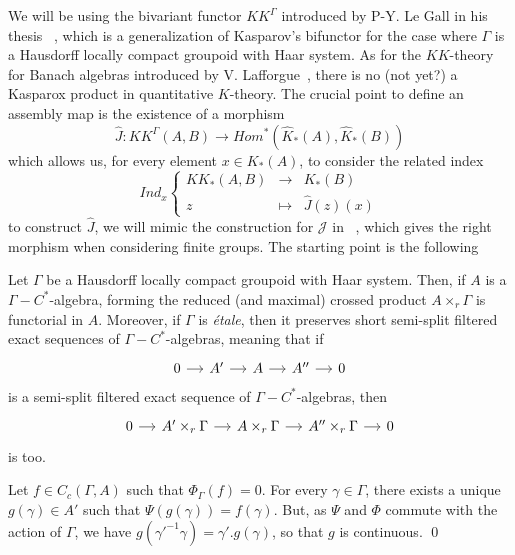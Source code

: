 We will be using the bivariant functor $KK^\Gamma$ introduced by P-Y. Le Gall in his thesis ~\cite{LeGall}, which is a generalization of Kasparov's bifunctor for the case where $\Gamma$ is a Hausdorff locally compact groupoid with Haar system. As for the $KK$-theory for Banach algebras introduced by V. Lafforgue~\cite{Lafforgue}, there is no (not yet?) a Kasparox product in quantitative $K$-theory. The crucial point to define an assembly map is the existence of a morphism 
\[\hat J : KK^{\Gamma}(A,B)\rightarrow Hom^*(\hat K_*(A),\hat K_*(B))\]
which allows us, for every element $x\in K_*(A)$, to consider the related index
\[Ind_x \left\{ \begin{array}{ccc} KK_*(A,B) & \rightarrow  & K_*(B)\\
	z & \mapsto & \hat J(z)(x)
\end{array}\right.\]
to construct $\hat J$, we will mimic the construction for $\mathcal J$ in ~\cite{OY2}, which gives the right morphism when considering finite groups. The starting point is the following 

\begin{lem}
Let $\Gamma$ be a Hausdorff locally compact groupoid with Haar system. Then, if $A$ is a $\Gamma-C^*$-algebra, forming the reduced (and maximal) crossed product $A\times_r \Gamma$ is functorial in $A$. Moreover, if $\Gamma$ is \textit{étale}, then it preserves short semi-split filtered exact sequences of $\Gamma-C^*$-algebras, meaning that if 
\[\begin{tikzcd}[column sep = small] 0\arrow{r} & A' \arrow{r} & A\arrow{r} & A'' \arrow{r} & 0\end{tikzcd}\]
is a semi-split filtered exact sequence of $\Gamma-C^*$-algebras, then 
\[\begin{tikzcd}[column sep = small] 0\arrow{r} & A' \times_r \Gamma\arrow{r} & A\times_r \Gamma\arrow{r} & A'' \times_r \Gamma\arrow{r} & 0\end{tikzcd}\]
is too.
\end{lem}

\begin{dem}
Let $f\in C_c(\Gamma, A)$ such that $\Phi_\Gamma(f)=0$. For every $\gamma \in \Gamma$, there exists a unique $g(\gamma)\in A'$ such that $\Psi(g(\gamma))=f(\gamma)$. But, as $\Psi$ and $\Phi$ commute with the action of $\Gamma$, we have $g(\gamma'^{-1}\gamma)=\gamma' . g(\gamma)$, so that $g$ is continuous.
\qed
\end{dem}
